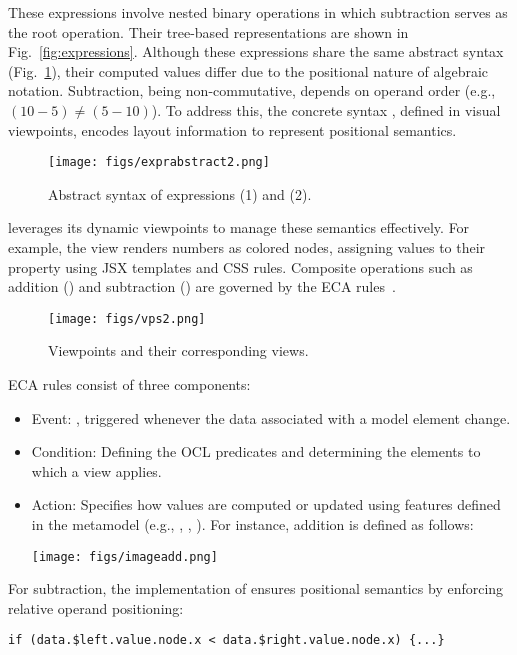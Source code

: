 These expressions involve nested binary operations in which subtraction serves as the root operation. Their tree-based representations are shown in Fig.~\ref{fig:expressions}. Although these expressions share the same abstract syntax (Fig.~\ref{fig:expr-abstract}), their computed values differ due to the positional nature of algebraic notation. Subtraction, being non-commutative, depends on operand order (e.g., $(10 - 5) \neq (5 - 10)$). To address this, the concrete syntax \jjodel{}, defined in visual viewpoints, encodes layout information to represent positional semantics.

\begin{figure}[ht]
    \centering
    \texttt{[image: figs/exprabstract2.png]}
    \caption{Abstract syntax of expressions (1) and (2).}
    \label{fig:expr-abstract}
\end{figure}

\jjodel{} leverages its dynamic viewpoints to manage these semantics effectively. For example, the  view renders numbers as colored nodes, assigning values to their  property using JSX templates and CSS rules. Composite operations such as addition () and subtraction () are governed by the ECA rules~\cite{widom1995active}.

\begin{figure}[ht]
    \centering
    \texttt{[image: figs/vps2.png]}
    \caption{Viewpoints and their corresponding views.}
    \label{fig:vps}
\end{figure}

ECA rules consist of three components:
\begin{itemize}
    \item Event: , triggered whenever the data associated with a model element change.
    \item Condition: Defining the OCL predicates and determining the elements to which a view applies.
    \item Action: Specifies how values are computed or updated using features defined in the metamodel (e.g., , , ). For instance, addition is defined as follows:
\begin{center}
    \texttt{[image: figs/imageadd.png]}
\end{center}
\end{itemize}

For subtraction, the implementation of  ensures positional semantics by enforcing relative operand positioning:
\begin{lstlisting}[language=JSX-template]
if (data.$left.value.node.x < data.$right.value.node.x) {...}
\end{lstlisting}

